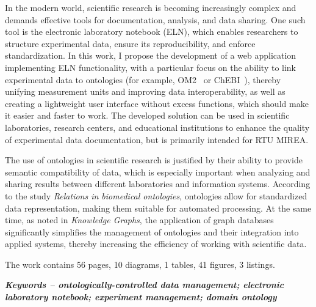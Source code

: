 In the modern world, scientific research is becoming increasingly complex and demands effective tools for documentation, analysis, and data sharing.
One such tool is the electronic laboratory notebook (ELN), which enables researchers to structure experimental data, ensure its reproducibility, and enforce standardization.
In this work, I propose the development of a web application implementing ELN functionality, with a particular focus on the ability to link experimental data to ontologies (for example, OM2~\cite{ontology:OM2} or ChEBI~\cite{ontology:СhEBI}), thereby unifying measurement units and improving data interoperability, as well as creating a lightweight user interface without excess functions, which should make it easier and faster to work.
The developed solution can be used in scientific laboratories, research centers, and educational institutions to enhance the quality of experimental data documentation, but is primarily intended for RTU MIREA.

The use of ontologies in scientific research is justified by their ability to provide semantic compatibility of data, which is especially important when analyzing and sharing results between different laboratories and information systems.
According to the study \textit{Relations in biomedical ontologies}\cite{ontology:base1}, ontologies allow for standardized data representation, making them suitable for automated processing.
At the same time, as noted in \textit{Knowledge Graphs}\cite{ontology:base2}, the application of graph databases significantly simplifies the management of ontologies and their integration into applied systems, thereby increasing the efficiency of working with scientific data.

The work contains 56 pages, 10 diagrams, 1 tables, 41 figures, 3 listings.

\textit{\textbf{Keywords -- ontologically-controlled data management; electronic laboratory notebook; experiment management; domain ontology}}
